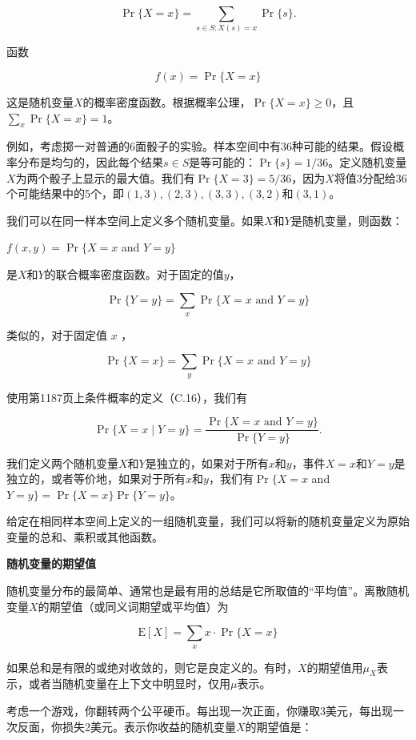 \documentclass[lang=cn,newtx,10pt,scheme=chinese]{elegantbook}
\begin{document}
$$
\operatorname{Pr}\{X=x\}=\sum_{s \in S: X(s)=x} \operatorname{Pr}\{s\} .
$$

函数

$$
f(x)=\operatorname{Pr}\{X=x\}
$$

这是随机变量$X$的概率密度函数。根据概率公理，$\operatorname{Pr}\{X=x\} \geq 0$，且$\sum_x \operatorname{Pr}\{X=x\}=1$。

例如，考虑掷一对普通的6面骰子的实验。样本空间中有36种可能的结果。假设概率分布是均匀的，因此每个结果$s \in S$是等可能的：$\operatorname{Pr}\{s\}=1 / 36$。定义随机变量$X$为两个骰子上显示的最大值。我们有$\operatorname{Pr}\{X=3\}=5 / 36$，因为$X$将值3分配给36个可能结果中的5个，即$(1,3),(2,3),(3,3),(3,2)$和$(3,1)$。

我们可以在同一样本空间上定义多个随机变量。如果$X$和$Y$是随机变量，则函数：

$f(x, y)=\operatorname{Pr}\{X=x$ and $Y=y\}$

是$X$和$Y$的联合概率密度函数。对于固定的值$y$，

$$
\operatorname{Pr}\{Y=y\}=\sum_x \operatorname{Pr}\{X=x \text { and } Y=y\}
$$

类似的，对于固定值 $x$ ，

$$
\operatorname{Pr}\{X=x\}=\sum_y \operatorname{Pr}\{X=x \text { and } Y=y\}
$$

使用第1187页上条件概率的定义（C.16），我们有

$$
\operatorname{Pr}\{X=x \mid Y=y\}=\frac{\operatorname{Pr}\{X=x \text { and } Y=y\}}{\operatorname{Pr}\{Y=y\}} .
$$

我们定义两个随机变量$X$和$Y$是独立的，如果对于所有$x$和$y$，事件$X=x$和$Y=y$是独立的，或者等价地，如果对于所有$x$和$y$，我们有$\operatorname{Pr}\{X=x$ and $Y=y\}=\operatorname{Pr}\{X=x\} \operatorname{Pr}\{Y=y\}$。

给定在相同样本空间上定义的一组随机变量，我们可以将新的随机变量定义为原始变量的总和、乘积或其他函数。

\textbf{随机变量的期望值}

随机变量分布的最简单、通常也是最有用的总结是它所取值的“平均值”。离散随机变量$X$的期望值（或同义词期望或平均值）为

$$
\mathrm{E}[X]=\sum_x x \cdot \operatorname{Pr}\{X=x\}
$$

如果总和是有限的或绝对收敛的，则它是良定义的。有时，$X$的期望值用$\mu_X$表示，或者当随机变量在上下文中明显时，仅用$\mu$表示。

考虑一个游戏，你翻转两个公平硬币。每出现一次正面，你赚取3美元，每出现一次反面，你损失2美元。表示你收益的随机变量$X$的期望值是：
\end{document}
